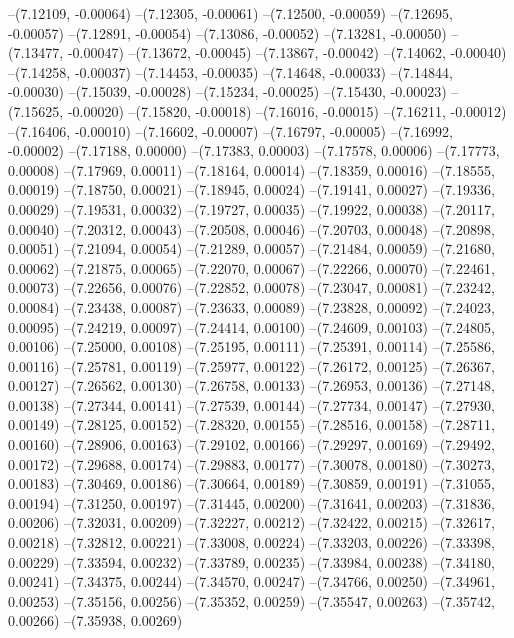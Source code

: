 --(7.12109, -0.00064)
--(7.12305, -0.00061)
--(7.12500, -0.00059)
--(7.12695, -0.00057)
--(7.12891, -0.00054)
--(7.13086, -0.00052)
--(7.13281, -0.00050)
--(7.13477, -0.00047)
--(7.13672, -0.00045)
--(7.13867, -0.00042)
--(7.14062, -0.00040)
--(7.14258, -0.00037)
--(7.14453, -0.00035)
--(7.14648, -0.00033)
--(7.14844, -0.00030)
--(7.15039, -0.00028)
--(7.15234, -0.00025)
--(7.15430, -0.00023)
--(7.15625, -0.00020)
--(7.15820, -0.00018)
--(7.16016, -0.00015)
--(7.16211, -0.00012)
--(7.16406, -0.00010)
--(7.16602, -0.00007)
--(7.16797, -0.00005)
--(7.16992, -0.00002)
--(7.17188, 0.00000)
--(7.17383, 0.00003)
--(7.17578, 0.00006)
--(7.17773, 0.00008)
--(7.17969, 0.00011)
--(7.18164, 0.00014)
--(7.18359, 0.00016)
--(7.18555, 0.00019)
--(7.18750, 0.00021)
--(7.18945, 0.00024)
--(7.19141, 0.00027)
--(7.19336, 0.00029)
--(7.19531, 0.00032)
--(7.19727, 0.00035)
--(7.19922, 0.00038)
--(7.20117, 0.00040)
--(7.20312, 0.00043)
--(7.20508, 0.00046)
--(7.20703, 0.00048)
--(7.20898, 0.00051)
--(7.21094, 0.00054)
--(7.21289, 0.00057)
--(7.21484, 0.00059)
--(7.21680, 0.00062)
--(7.21875, 0.00065)
--(7.22070, 0.00067)
--(7.22266, 0.00070)
--(7.22461, 0.00073)
--(7.22656, 0.00076)
--(7.22852, 0.00078)
--(7.23047, 0.00081)
--(7.23242, 0.00084)
--(7.23438, 0.00087)
--(7.23633, 0.00089)
--(7.23828, 0.00092)
--(7.24023, 0.00095)
--(7.24219, 0.00097)
--(7.24414, 0.00100)
--(7.24609, 0.00103)
--(7.24805, 0.00106)
--(7.25000, 0.00108)
--(7.25195, 0.00111)
--(7.25391, 0.00114)
--(7.25586, 0.00116)
--(7.25781, 0.00119)
--(7.25977, 0.00122)
--(7.26172, 0.00125)
--(7.26367, 0.00127)
--(7.26562, 0.00130)
--(7.26758, 0.00133)
--(7.26953, 0.00136)
--(7.27148, 0.00138)
--(7.27344, 0.00141)
--(7.27539, 0.00144)
--(7.27734, 0.00147)
--(7.27930, 0.00149)
--(7.28125, 0.00152)
--(7.28320, 0.00155)
--(7.28516, 0.00158)
--(7.28711, 0.00160)
--(7.28906, 0.00163)
--(7.29102, 0.00166)
--(7.29297, 0.00169)
--(7.29492, 0.00172)
--(7.29688, 0.00174)
--(7.29883, 0.00177)
--(7.30078, 0.00180)
--(7.30273, 0.00183)
--(7.30469, 0.00186)
--(7.30664, 0.00189)
--(7.30859, 0.00191)
--(7.31055, 0.00194)
--(7.31250, 0.00197)
--(7.31445, 0.00200)
--(7.31641, 0.00203)
--(7.31836, 0.00206)
--(7.32031, 0.00209)
--(7.32227, 0.00212)
--(7.32422, 0.00215)
--(7.32617, 0.00218)
--(7.32812, 0.00221)
--(7.33008, 0.00224)
--(7.33203, 0.00226)
--(7.33398, 0.00229)
--(7.33594, 0.00232)
--(7.33789, 0.00235)
--(7.33984, 0.00238)
--(7.34180, 0.00241)
--(7.34375, 0.00244)
--(7.34570, 0.00247)
--(7.34766, 0.00250)
--(7.34961, 0.00253)
--(7.35156, 0.00256)
--(7.35352, 0.00259)
--(7.35547, 0.00263)
--(7.35742, 0.00266)
--(7.35938, 0.00269)

